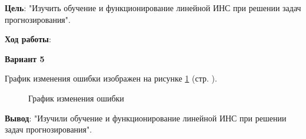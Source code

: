\textbf{Цель}: "Изучить обучение и функционирование линейной ИНС при решении задач прогнозирования".

\begin{center}
    \textbf{Ход работы}:
\end{center}

\begin{center}
    \textbf{Вариант 5}
\end{center}



\newpage



График изменения ошибки изображен на рисунке \ref{fig:figure1} (стр. \pageref{fig:figure1}).

\begin{figure}[!htp]
    \caption{График изменения ошибки}
    \label{fig:figure1}
\end{figure}

\textbf{Вывод}: "Изучили обучение и функционирование линейной ИНС при решении задач прогнозирования".